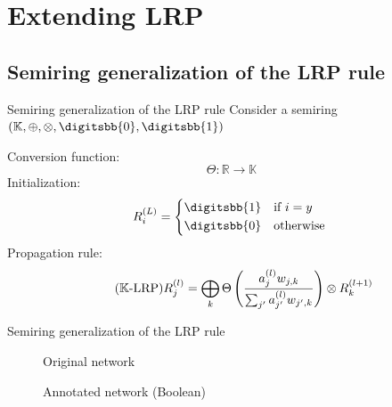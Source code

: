 \documentclass[aspectratio=169]{beamer}
\theoremstyle{definition}
\begin{document}
\section{Extending LRP}
\subsection{Semiring generalization of the LRP rule}
\begin{frame}{Semiring generalization of the LRP rule}
    Consider a semiring $(\mathbb{K}, \oplus, \otimes, \digitsbb{0}, \digitsbb{1})$

    Conversion function:
    \begin{equation*}
        \Theta : \mathbb{R} \longrightarrow \mathbb{K}
    \end{equation*}
    Initialization:
    \begin{equation}
        R^{(L)}_i = \begin{cases*}
            \digitsbb{1} & if $i = y$\\
            \digitsbb{0} & otherwise
        \end{cases*}
    \end{equation}
    Propagation rule:
    \begin{equation}
        \tag{$\mathbb{K}$-LRP}
        R^{(l)}_j = \bigoplus_k \Theta\left(
            \frac{a^{(l)}_jw_{j, k}}{\sum_{j'}a^{(l)}_{j'}w_{j', k}} 
        \right) \otimes R^{(l+1)}_k
    \end{equation}
\end{frame}

\begin{frame}{Semiring generalization of the LRP rule}
    \begin{figure}[ht]
        \begin{minipage}[c]{0.45\linewidth}
            \centering
            
            \caption{Original network}
        \end{minipage}
        \hspace{0.25cm}
        \begin{minipage}[c]{0.45\linewidth}
            \centering
            
            \caption{Annotated network (Boolean)}
        \end{minipage}
    \end{figure}
\end{frame}
\end{document}
